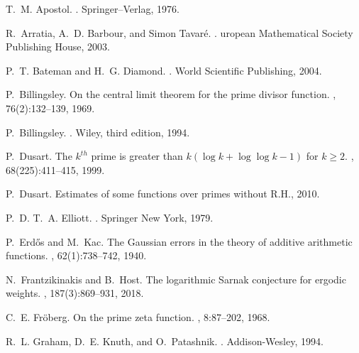 \documentclass[11pt,reqno,a4letter]{article}
\numberwithin{equation}{section}
\numberwithin{figure}{section}
\numberwithin{table}{section}
\theoremstyle{plain}
\numberwithin{theorem}{section}
\theoremstyle{definition}
\theoremstyle{remark}
\begin{document}
\renewcommand{\refname}{Reference} 


\begin{thebibliography}{10}

T.~M. Apostol.
.
\newblock Springer--Verlag, 1976.

R.~Arratia, A.~D. Barbour, and Simon Tavar{\'{e}}.
.
uropean Mathematical Society Publishing House, 2003.

P.~T. Bateman and H.~G. Diamond.
.
\newblock World Scientific Publishing, 2004.

P.~Billingsley.
\newblock On the central limit theorem for the prime divisor function.
, 76(2):132--139, 1969.

P.~Billingsley.
.
\newblock Wiley, third edition, 1994.

P.~Dusart.
\newblock The $k^{th}$ prime is greater than $k(\log k +\log\log k-1)$ for $k
  \geq 2$.
, 68(225):411--415, 1999.

P.~Dusart.
\newblock Estimates of some functions over primes without {R}.{H}., 2010.

P.~D. T.~A. Elliott.
.
\newblock Springer New York, 1979.

P.~Erd{\H{o}}s and M.~Kac.
\newblock The {G}aussian errors in the theory of additive arithmetic functions.
, 62(1):738--742, 1940.

N.~Frantzikinakis and B.~Host.
\newblock The logarithmic {S}arnak conjecture for ergodic weights.
, 187(3):869--931, 2018.

C.~E. Fr{\"{o}}berg.
\newblock On the prime zeta function.
, 8:87--202, 1968.

R.~L. Graham, D.~E. Knuth, and O.~Patashnik.
.
\newblock Addison-Wesley, 1994.


\end{thebibliography}
\end{document}
